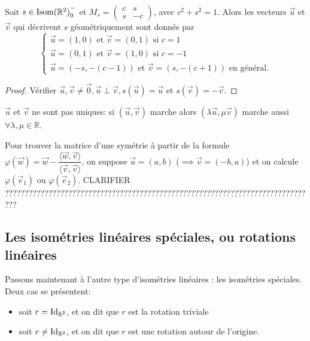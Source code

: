 \documentclass{book}
\numberwithin{equation}{section}
\renewcommand{\phi}{\varphi}
\providecommand{\plan}{{\mathbb R^2}}
\providecommand{\origin}{{\vec 0}}
\providecommand{\id}{{\textnormal{Id}}}
\providecommand{\IdR}{{\id_\plan}}
\providecommand{\isom}{{\textnormal{Isom}(\plan)}}
\providecommand{\isomom}{\isom_0^-}
\providecommand{\scalaire}[1]{{\langle#1\rangle}}
\begin{document}
\begin{thm}
	Soit $s \in \isomom$ et $M_s = \left(\begin{smallmatrix} c&s\\s&-c \end{smallmatrix}\right)$, avec $c^2 + s^2 = 1$. Alors les vecteurs $\vec u$ et $\vec v$ qui décrivent $s$ géométriquement sont donnés par
	\begin{equation*}
		\begin{cases}
			\vec u = (1, 0) \text{ et } \vec v = (0, 1) \text{ si } c = 1\\
			\vec u = (0, 1) \text{ et } \vec v = (1, 0) \text{ si } c = -1\\
			\vec u = (-s, -(c-1)) \text{ et } \vec v = (s, -(c+1)) \text{ en général.}
		\end{cases}
	\end{equation*}
\end{thm}
\begin{proof}
	Vérifier $\vec u, \vec v \neq \origin, \vec u \perp \vec v, s(\vec u) = \vec u$ et $s(\vec v) = -\vec v$.
\end{proof}
\begin{remark}
	$\vec u$ et $\vec v$ ne sont pas uniques: si $(\vec u, \vec v)$ marche alors $(\lambda \vec u, \mu \vec v)$ marche aussi $\forall \lambda, \mu \in \mathbb R$.\par
	Pour trouver la matrice d'une symétrie à partir de la formule $\phi(\vec w) = \vec w - \dfrac{\scalaire{\vec w, \vec v}}{\scalaire{\vec v, \vec v}}$, on suppose $\vec u = (a, b)$ ($\implies \vec v = (-b, a)$) et on calcule $\phi(\vec e_1)$ ou $\phi(\vec e_2)$. CLARIFIER ???????????????????????????????????????????????????????????????????????????????
\end{remark}

\subsection{Les isométries linéaires spéciales, ou rotations linéaires}
Passons maintenant à l'autre type d'isométries linéaires : les isométries spéciales. Deux cas se présentent:
\begin{itemize}
	\item soit $r = \IdR$, et on dit que $r$ est la rotation triviale
	\item soit $r \neq \IdR$, et on dit que $r$ est une rotation autour de l'origine.
\end{itemize}
\end{document}
